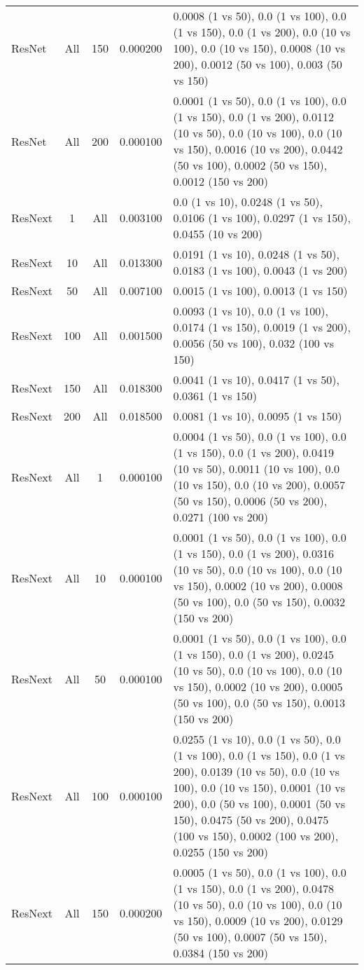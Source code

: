 \begin{tabular}{|l|c|c|c|p{7cm}|}
ResNet & All & 150 & 0.000200 & 0.0008 (1 vs 50), 0.0 (1 vs 100), 0.0 (1 vs 150), 0.0 (1 vs 200), 0.0 (10 vs 100), 0.0 (10 vs 150), 0.0008 (10 vs 200), 0.0012 (50 vs 100), 0.003 (50 vs 150) \\
ResNet & All & 200 & 0.000100 & 0.0001 (1 vs 50), 0.0 (1 vs 100), 0.0 (1 vs 150), 0.0 (1 vs 200), 0.0112 (10 vs 50), 0.0 (10 vs 100), 0.0 (10 vs 150), 0.0016 (10 vs 200), 0.0442 (50 vs 100), 0.0002 (50 vs 150), 0.0012 (150 vs 200) \\
ResNext & 1 & All & 0.003100 & 0.0 (1 vs 10), 0.0248 (1 vs 50), 0.0106 (1 vs 100), 0.0297 (1 vs 150), 0.0455 (10 vs 200) \\
ResNext & 10 & All & 0.013300 & 0.0191 (1 vs 10), 0.0248 (1 vs 50), 0.0183 (1 vs 100), 0.0043 (1 vs 200) \\
ResNext & 50 & All & 0.007100 & 0.0015 (1 vs 100), 0.0013 (1 vs 150) \\
ResNext & 100 & All & 0.001500 & 0.0093 (1 vs 10), 0.0 (1 vs 100), 0.0174 (1 vs 150), 0.0019 (1 vs 200), 0.0056 (50 vs 100), 0.032 (100 vs 150) \\
ResNext & 150 & All & 0.018300 & 0.0041 (1 vs 10), 0.0417 (1 vs 50), 0.0361 (1 vs 150) \\
ResNext & 200 & All & 0.018500 & 0.0081 (1 vs 10), 0.0095 (1 vs 150) \\
ResNext & All & 1 & 0.000100 & 0.0004 (1 vs 50), 0.0 (1 vs 100), 0.0 (1 vs 150), 0.0 (1 vs 200), 0.0419 (10 vs 50), 0.0011 (10 vs 100), 0.0 (10 vs 150), 0.0 (10 vs 200), 0.0057 (50 vs 150), 0.0006 (50 vs 200), 0.0271 (100 vs 200) \\
ResNext & All & 10 & 0.000100 & 0.0001 (1 vs 50), 0.0 (1 vs 100), 0.0 (1 vs 150), 0.0 (1 vs 200), 0.0316 (10 vs 50), 0.0 (10 vs 100), 0.0 (10 vs 150), 0.0002 (10 vs 200), 0.0008 (50 vs 100), 0.0 (50 vs 150), 0.0032 (150 vs 200) \\
ResNext & All & 50 & 0.000100 & 0.0001 (1 vs 50), 0.0 (1 vs 100), 0.0 (1 vs 150), 0.0 (1 vs 200), 0.0245 (10 vs 50), 0.0 (10 vs 100), 0.0 (10 vs 150), 0.0002 (10 vs 200), 0.0005 (50 vs 100), 0.0 (50 vs 150), 0.0013 (150 vs 200) \\
ResNext & All & 100 & 0.000100 & 0.0255 (1 vs 10), 0.0 (1 vs 50), 0.0 (1 vs 100), 0.0 (1 vs 150), 0.0 (1 vs 200), 0.0139 (10 vs 50), 0.0 (10 vs 100), 0.0 (10 vs 150), 0.0001 (10 vs 200), 0.0 (50 vs 100), 0.0001 (50 vs 150), 0.0475 (50 vs 200), 0.0475 (100 vs 150), 0.0002 (100 vs 200), 0.0255 (150 vs 200) \\
ResNext & All & 150 & 0.000200 & 0.0005 (1 vs 50), 0.0 (1 vs 100), 0.0 (1 vs 150), 0.0 (1 vs 200), 0.0478 (10 vs 50), 0.0 (10 vs 100), 0.0 (10 vs 150), 0.0009 (10 vs 200), 0.0129 (50 vs 100), 0.0007 (50 vs 150), 0.0384 (150 vs 200) \\

\end{tabular}
